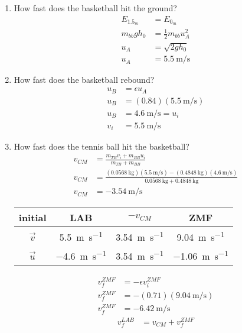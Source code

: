 \documentclass{article}
\begin{document}
\begin{enumerate}[label = \textbf{\arabic*)}]
	\item How fast does the basketball hit the ground?
		\begin{align*}
			E_{1.5_m} & = E_{0_m} \\
			m_{bb}gh_0 & = \frac{1}{2}m_{bb}u_A^2 \\
			u_A & = \sqrt{2gh_0} \\
			u_A & = \SI{5.5}{\meter \per \second}
		\end{align*}
	\item How fast does the basketball rebound?
		\begin{align*}
			u_B & = \epsilon u_A \\
			u_B & = (0.84)(\SI{5.5}{\meter \per \second}) \\
			u_B & = \SI{4.6}{\meter \per \second} = u_i \\
			v_i & = \SI{5.5}{\meter \per \second}
		\end{align*}
	\item How fast does the tennis ball hit the basketball?
		\begin{align*}
			v_{CM} & = \frac{m_{TB}v_i + m_{BB}u_i}{m_{TB} + m_{BB}} \\
			v_{CM} & = \frac{(\SI{0.0568}{\kilogram})(\SI{5.5}{\meter \per \second}) - (\SI{0.4848}{\kilogram})(\SI{4.6}{\meter \per \second})}{\SI{0.0568}{\kilogram} + \SI{0.4848}{\kilogram}} \\
			v_{CM} & = \SI{-3.54}{\meter \per \second}
		\end{align*}
		\begin{tabular}{ | c | c | c | c | }
			\hline
			initial & LAB & $ -v_{CM} $ & ZMF \\
			\hline
			$ \vec{v} $ & \SI{5.5}{\meter \per \second} & \SI{3.54}{\meter \per \second} & \SI{9.04}{\meter \per \second} \\
			\hline
			$ \vec{u} $ & \SI{-4.6}{\meter \per \second} & \SI{3.54}{\meter \per \second} & \SI{-1.06}{\meter \per \second} \\
			\hline
		\end{tabular}
		\begin{align*}
			v_f^{ZMF} & = -\epsilon v_i^{ZMF} \\
			v_f^{ZMF} & = -(0.71)(\SI{9.04}{\meter \per \second}) \\
			v_f^{ZMF} & = \SI{-6.42}{\meter \per \second}
		\end{align*}
		\begin{align*}
			v_f^{LAB} & = v_{CM} + v_f^{ZMF} \\

\end{align*}
\end{enumerate}
\end{document}
